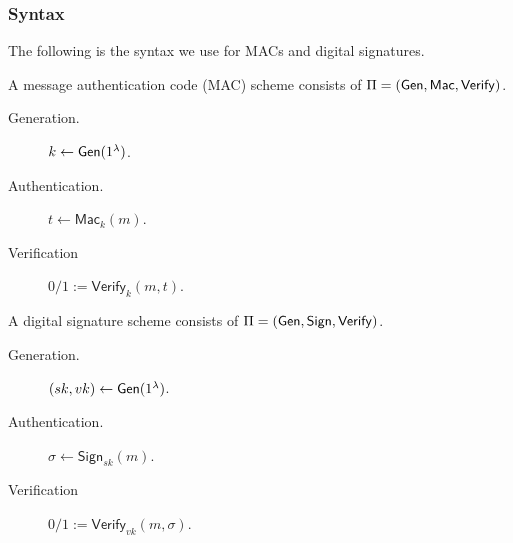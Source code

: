 \subsubsection{Syntax}\label{sec:message-integrity:syntax}
The following is the syntax we use for MACs and digital signatures.

A message authentication code (MAC) scheme consists of $\Pi = (\operatorname{\mathsf{Gen}}, \mathsf{Mac}, \mathsf{Verify})$.
\begin{description}
    \item[Generation.] $k\leftarrow \operatorname{\mathsf{Gen}}(1^\lambda)$.
    \item[Authentication.] $t \leftarrow \mathsf{Mac}_k(m)$.
    \item[Verification] $0/1 := \mathsf{Verify}_k(m, t)$.
\end{description}

A digital signature scheme consists of $\Pi = (\operatorname{\mathsf{Gen}}, \mathsf{Sign}, \mathsf{Verify})$.
\begin{description}
    \item[Generation.] $(sk, vk)\leftarrow \operatorname{\mathsf{Gen}}(1^\lambda)$.
    \item[Authentication.] $\sigma \leftarrow \mathsf{Sign}_{sk}(m)$.
    \item[Verification] $0/1 := \mathsf{Verify}_{vk}(m, \sigma)$.
\end{description}
